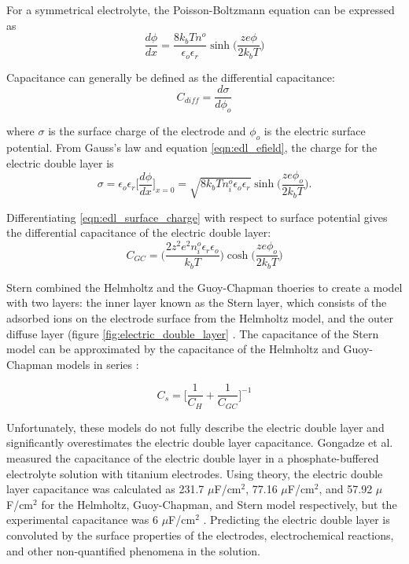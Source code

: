 \noindent For a symmetrical electrolyte, the Poisson-Boltzmann equation can be expressed as
\begin{equation}
    \frac{d\phi}{dx} = \frac{8k_bTn^o}{\epsilon_o\epsilon_r}\sinh\Big(\frac{ze\phi}{2k_bT}\Big)
    \label{eqn:edl_efield}
\end{equation}

\noindent Capacitance can generally be defined as the differential capacitance:
\begin{equation}
    C_{diff} = \frac{d\sigma}{d\phi_o}
\end{equation}

\noindent where $\sigma$ is the surface charge of the electrode and $\phi_o$ is the electric surface potential. From Gauss's law and equation \ref{eqn:edl_efield}, the charge for the electric double layer is
\begin{equation}
    \sigma = \epsilon_o\epsilon_r \Big[\frac{d\phi}{dx}\Big]_{x=0} = \sqrt{8k_bTn_i^o\epsilon_o\epsilon_r}\sinh\Big(\frac{ze\phi_o}{2k_bT}\Big).
    \label{eqn:edl_surface_charge}
\end{equation}

\noindent Differentiating \ref{eqn:edl_surface_charge} with respect to surface potential gives the differential capacitance of the electric double layer:
\begin{equation}
    C_{GC} = \Big(\frac{2z^2e^2n_i^o\epsilon_r\epsilon_o}{k_bT}\Big)\cosh\Big(\frac{ze\phi_o}{2k_bT}\Big)
\end{equation}

\par Stern combined the Helmholtz and the Guoy-Chapman thoeries to create a model with two layers: the inner layer known as the Stern layer, which consists of the adsorbed ions on the electrode surface from the Helmholtz model, and the outer diffuse layer (figure \ref{fig:electric_double_layer} \cite{_jes2011.pdf_????}. The capacitance of the Stern model can be approximated by the capacitance of the Helmholtz and Guoy-Chapman models in series \cite{_gongadze.pdf_????}:

\begin{equation}
    C_s = \bigg[ \frac{1}{C_H} + \frac{1}{C_{GC}}\bigg]^{-1}
\end{equation}

\par Unfortunately, these models do not fully describe the electric double layer and significantly overestimates the electric double layer capacitance. Gongadze et al. measured the capacitance of the electric double layer in a phosphate-buffered electrolyte solution with titanium electrodes. Using theory, the electric double layer capacitance was calculated as 231.7 $\mu$F/cm$^2$, 77.16 $\mu$F/cm$^2$, and 57.92 $\mu$F/cm$^2$ for the Helmholtz, Guoy-Chapman, and Stern model respectively, but the experimental capacitance was 6 $\mu$F/cm$^2$ \cite{_gongadze.pdf_????}. Predicting the electric double layer is convoluted by the surface properties of the electrodes, electrochemical reactions, and other non-quantified phenomena in the solution. 

